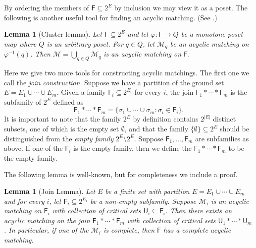 \documentclass[10pt]{amsart}
\newcommand{\MM}{\mathcal{M}}
\newtheorem{lemma}[thm]{Lemma}
\theoremstyle{definition}
\begin{document}
	
	
	By ordering the members of $\mathsf{F} \subseteq 2^E$ by inclusion we may view it as a poset. 
	The following is another useful tool for finding an acyclic matching. (See \cite[Lemma 4.2]{jonsson_complex_graph}.)
	
	\begin{lemma}[Cluster lemma]\label{cluster}
		Let $\mathsf{F}\subseteq 2^E$ and let $\varphi: \mathsf{F}\to Q$ be a monotone poset map where $Q$ is an arbitrary poset. For $q\in Q$, let $\MM_q$ be an acyclic matching on $\varphi^{-1}(q)$.
		Then $\MM=\bigcup_{q\in Q}\MM_q$ is an acyclic matching on $\mathsf{F}$.
	\end{lemma}
	
	Here we give two more tools for constructing acyclic matchings. The first one we call the {\em join construction}. Suppose we have a partition of the ground set $E = E_1\cup \cdots \cup E_m$. Given a family $\mathsf{F}_i\subseteq 2^{E_i}$ for every $i$, the join $\mathsf{F}_1 * \cdots * \mathsf{F}_m$ is the subfamily of $2^E$ defined as
	\[\mathsf{F}_1* \cdots * \mathsf{F}_m = \{\sigma_1 \cup \cdots \cup \sigma_m : \sigma_i\in \mathsf{F}_i\}.\]
	It is important to note that the family $2^E$ by definition contains $2^{|E|}$ distinct subsets, one of which is the empty set $\emptyset$, and that the family $\{\emptyset\} \subseteq 2^E$ should be distinguished from the {\em empty family} $2^E\setminus 2^E$. Suppose $\mathsf{F}_1, \dots, \mathsf{F}_m$ are subfamilies as above. If one of the $\mathsf{F}_i$ is the empty family, then we define the $\mathsf{F}_1* \cdots * \mathsf{F}_m$ to be the empty family.
	
	\medskip
	
	
	The following lemma is well-known, but for completeness we include a proof. 
	
	\begin{lemma}[Join Lemma]\label{product}
		Let $E$ be a finite set with partition $E=E_1\cup \cdots \cup E_m$ and for every $i$, let $\mathsf{F}_i\subseteq 2^{E_i}$ be a non-empty subfamily. Suppose $\MM_i$ is an acyclic matching on $\mathsf{F}_i$ with collection of critical sets $\mathsf{U}_i \subseteq \mathsf{F}_i$.
		Then
		there exists an acyclic matching %
		on the join $\mathsf{F}_1 * \cdots * \mathsf{F}_m$ with collection of critical sets $\mathsf{U}_1 * \cdots * \mathsf{U}_m$. In particular, if one of the $\MM_i$ is complete, then $\mathsf{F}$ has a complete acyclic matching.
	\end{lemma}
	
\end{document}
